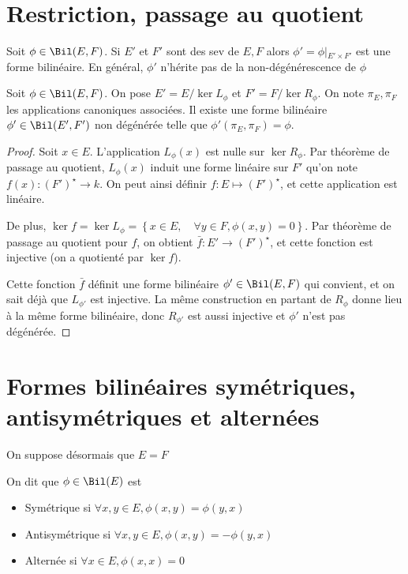 
\section{Restriction, passage au quotient}

\begin{prop}
    Soit $\phi\in \Bil (E, F)$. Si  $E'$ et  $F'$ sont des sev de  $E, F$ alors  $\phi'=\phi\left|_{E'\times F'}\right.$ est une forme bilinéaire. En général,  $\phi'$ n'hérite pas de la non-dégénérescence de  $\phi$
\end{prop}


\begin{prop}
    Soit $\phi \in  \Bil(E, F)$. On pose $E'=E / \ker L_\phi$ et  $F'=F / \ker R_\phi$. On note  $\pi_E, \pi_F$ les applications canoniques associées. Il existe une forme bilinéaire $\phi' \in  \Bil(E', F')$ non dégénérée telle que $\phi'(\pi_E, \pi_F)=\phi$.
\end{prop}

\begin{proof}
    Soit $x \in  E$. L'application $L_\phi(x)$ est nulle sur  $\ker R_\phi$. Par théorème de passage au quotient,  $L_\phi(x)$ induit une forme linéaire sur  $F'$ qu'on note  $f(x):(F')^\star \longrightarrow k$. On peut ainsi définir $f:E \longmapsto (F')^\star$, et cette application est linéaire.

    De plus, $\ker f=\ker L_\phi= \left\{ x \in E, \quad  \forall  y \in  F, \phi(x, y)=0 \right\} $. Par théorème de passage au quotient pour $f$, on obtient  $\bar{f} : E' \longrightarrow (F')^\star$, et cette fonction est injective (on a quotienté par $\ker f$).

    Cette fonction $\bar{f}$ définit une forme bilinéaire $\phi' \in  \Bil(E, F)$ qui convient, et on sait déjà que $L_{\phi'}$ est injective. La même construction en partant de  $R_\phi$ donne lieu à la même forme bilinéaire, donc  $R_{\phi'}$ est aussi injective et  $\phi'$ n'est pas dégénérée.
\end{proof}

\section{Formes bilinéaires symétriques, antisymétriques et alternées}

On suppose désormais que $E=F$

 \begin{dfn}
     On dit que $\phi \in  \Bil(E)$ est \begin{itemize}
         \item Symétrique si $\forall  x, y \in  E, \phi(x, y)=\phi(y, x)$ 
         \item Antisymétrique si $\forall  x, y \in  E, \phi(x, y)=-\phi(y, x)$ 
         \item Alternée si $\forall  x \in  E, \phi(x, x)=0$
     \end{itemize}
\end{dfn}

